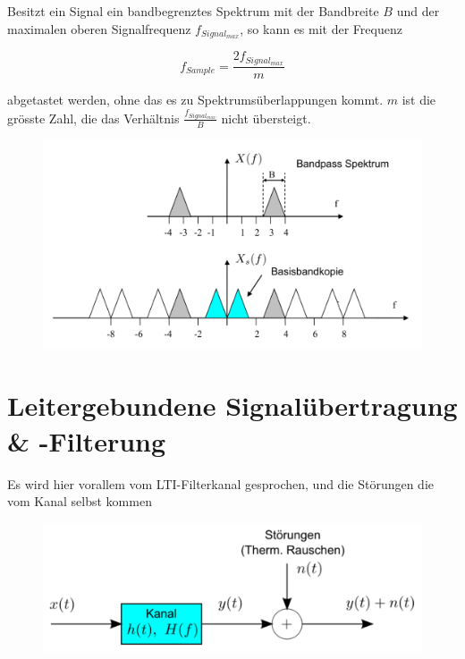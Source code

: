 \documentclass[
  10pt,
  a4paper,
  german]{article}
\numberwithin{equation}{section}
\begin{document}
Besitzt ein Signal ein bandbegrenztes Spektrum mit der Bandbreite \(B\)
und der maximalen oberen Signalfrequenz \(f_{Signal_{max}}\), so kann es
mit der Frequenz

\[
f_{Sample}=\frac{2 f_{Signal_{max}}}{m}
\]

abgetastet werden, ohne das es zu Spektrumsüberlappungen kommt. \(m\)
ist die grösste Zahl, die das Verhältnis \(\frac{f_{Signal_{max}}}{B}\)
nicht übersteigt.

\begin{figure}[H]

{\centering \includegraphics{images/02_BandpassAbtastung.png}

}

\end{figure}

\hypertarget{leitergebundene-signaluxfcbertragung--filterung}{%
\section{Leitergebundene Signalübertragung \&
-Filterung}\label{leitergebundene-signaluxfcbertragung--filterung}}

Es wird hier vorallem vom LTI-Filterkanal gesprochen, und die Störungen
die vom Kanal selbst kommen

\begin{figure}[H]

{\centering \includegraphics{images/01_Wiedergabetreue.png}

}

\end{figure}
\end{document}
